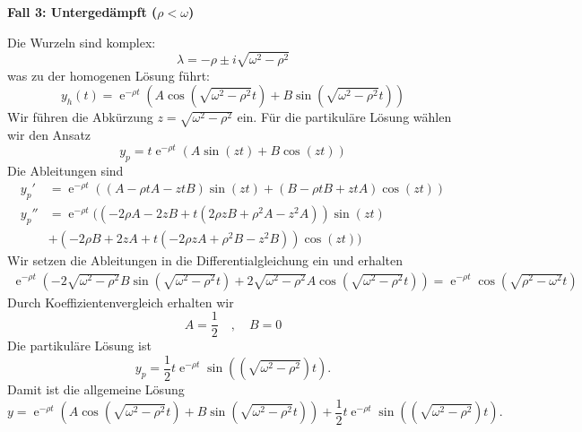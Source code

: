 {\textbf{Fall 3: Untergedämpft (\(\rho < \omega\))}

Die Wurzeln sind komplex:
\[
\lambda = -\rho \pm i\sqrt{\omega^2 - \rho^2}
\]
was zu der homogenen Lösung führt:
\[
y_h(t) = \operatorname{e}^{-\rho t}(A \cos(\sqrt{\omega^2 - \rho^2} t) + B \sin(\sqrt{\omega^2 - \rho^2} t))
\]
Wir führen die Abkürzung $z = \sqrt{\omega^2 - \rho^2}$ ein.
Für die partikuläre Lösung wählen wir den Ansatz
$$
y_p = t\operatorname{e}^{-\rho t}(A\sin(zt) + B\cos(zt)) 
$$
Die Ableitungen sind
\begin{align*}
y_p' &= \operatorname{e}^{-\rho t}((A- \rho t A - ztB)\sin(zt) + (B-\rho t B + ztA) \cos(zt))\\
y_p'' &= \operatorname{e}^{-\rho t}( (-2\rho A - 2zB + t(2\rho zB + \rho^2 A -z^2A)) \sin(zt) \\
&+
          (-2\rho B +2zA + t(-2\rho zA + \rho^2 B - z^2B)) \cos(zt))
\end{align*}
Wir setzen die Ableitungen in die Differentialgleichung ein und erhalten
\begin{align*}
\operatorname{e}^{-\rho t}(-2\sqrt{\omega^2 - \rho^2}B \sin(\sqrt{\omega^2-\rho^2}t)
+2\sqrt{\omega^2 - \rho^2}A \cos(\sqrt{\omega^2-\rho^2}t) ) = 
 \operatorname{e}^{-\rho t} \cos(\sqrt{\rho^2 - \omega^2}t)
\end{align*}
Durch Koeffizientenvergleich erhalten wir
$$
A= \frac{1}{2} \quad , \quad B =0
$$
Die partikuläre Lösung ist
$$
y_p = \frac{1}{2}t\operatorname{e}^{-\rho t} \sin((\sqrt{\omega^2 - \rho^2})t).
$$
Damit ist die allgemeine Lösung
$$
y = \operatorname{e}^{-\rho t}(A \cos(\sqrt{\omega^2 - \rho^2} t) + B \sin(\sqrt{\omega^2 - \rho^2} t))+\frac{1}{2}t\operatorname{e}^{-\rho t} \sin((\sqrt{\omega^2 - \rho^2})t).
$$
}



